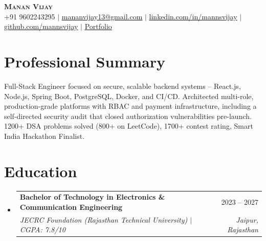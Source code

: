 \documentclass[letterpaper,11pt]{article}
\makeatletter
\newcommand{\resumeSubheading}[4]{
  \vspace{-2pt}\item
    \begin{tabular*}{0.97\textwidth}[t]{l@{\extracolsep{\fill}}r}
      \textbf{#1} & #2 \\
      \textit{\small#3} & \textit{\small #4} \\
    \end{tabular*}\vspace{-9pt}
}
\newcommand{\resumeSubHeadingListStart}{\begin{itemize}[leftmargin=0.15in, label={}]}
\newcommand{\resumeSubHeadingListEnd}{\end{itemize}}
\makeatother
\begin{document}

\begin{center}
    \textbf{\Huge \scshape Manan Vijay} \\ \vspace{3pt}
    \small
    +91 9602243295 $|$
    \href{mailto:mananvijay13@gmail.com}{\underline{mananvijay13@gmail.com}} $|$
    \href{https://www.linkedin.com/in/mannsvijay/}{\underline{linkedin.com/in/mannsvijay}} $|$
    \href{https://github.com/mannsvijay}{\underline{github.com/mannsvijay}} $|$
    \href{https://portfolio-mannsvijays-projects.vercel.app/}{\underline{Portfolio}}
\end{center}

\section{Professional  Summary}
\small{
Full-Stack Engineer focused on secure, scalable backend systems -- React.js, Node.js, Spring Boot, PostgreSQL, Docker, and CI/CD. Architected multi-role, production-grade platforms with RBAC and payment infrastructure, including a self-directed security audit that closed authorization vulnerabilities pre-launch. 1200+ DSA problems solved (800+ on LeetCode), 1700+ contest rating, Smart India Hackathon Finalist.
}
\section{Education}
  \resumeSubHeadingListStart
    \resumeSubheading
      {Bachelor of Technology in Electronics \& Communication Engineering}{2023 --  2027}
      {JECRC Foundation (Rajasthan Technical University) $|$ CGPA: 7.8/10}{Jaipur, Rajasthan}
  \resumeSubHeadingListEnd
\end{document}
